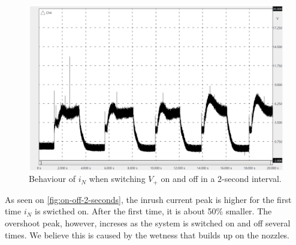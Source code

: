 \documentclass[oneside,12pt]{article}
\begin{document}
\begin{figure}[h!]
    \centering
    \includegraphics[width=\textwidth,trim=1 1 1 1,clip]{figures/on-off-2-seconds.png}
    \caption{Behaviour of $i_N$ when switching $V_+$ on and off in a 2-second interval.}
    \label{fig:on-off-2-seconds}
\end{figure}

As seen on \autoref{fig:on-off-2-seconds}, the inrush current peak is higher for the first time $i_N$ is swicthed on.
After the first time, it is about 50\% smaller. The overshoot peak, however, increses as the system is switched on and off several times.
We believe this is caused by the wetness that builds up on the nozzles. 


\newpage    \pagestyle{plain}

\end{document}
